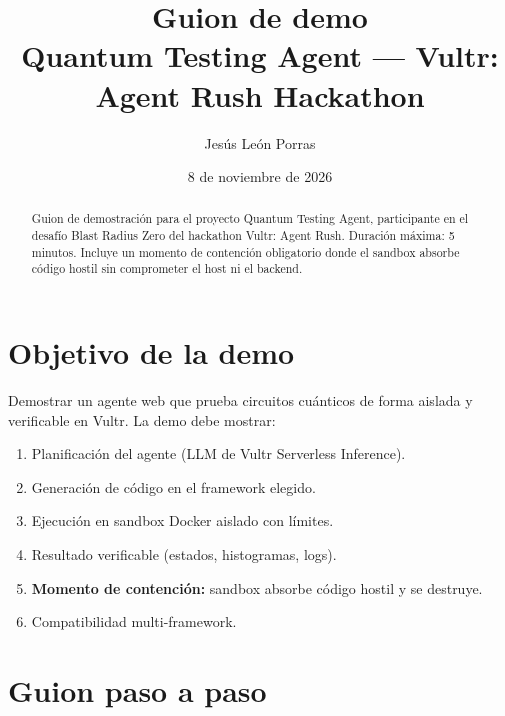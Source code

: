 \documentclass[11pt,a4paper]{article}
\title{\textbf{Guion de demo}\\
\large Quantum Testing Agent — Vultr: Agent Rush Hackathon}
\author{Jesús León Porras}
\date{8 de noviembre de 2026}
\begin{document}
\maketitle

\begin{abstract}
Guion de demostración para el proyecto Quantum Testing Agent, participante en el
desafío Blast Radius Zero del hackathon Vultr: Agent Rush. Duración máxima: 5
minutos. Incluye un momento de contención obligatorio donde el sandbox absorbe
código hostil sin comprometer el host ni el backend.
\end{abstract}

\section{Objetivo de la demo}

Demostrar un agente web que prueba circuitos cuánticos de forma aislada y
verificable en Vultr. La demo debe mostrar:
\begin{enumerate}
    \item Planificación del agente (LLM de Vultr Serverless Inference).
    \item Generación de código en el framework elegido.
    \item Ejecución en sandbox Docker aislado con límites.
    \item Resultado verificable (estados, histogramas, logs).
    \item \textbf{Momento de contención:} sandbox absorbe código hostil y se destruye.
    \item Compatibilidad multi-framework.
\end{enumerate}

\section{Guion paso a paso}
\end{document}
